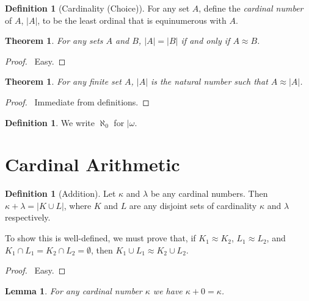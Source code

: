 \documentclass{report}
\let\qed\relax
\newtheorem{lemma}[axiom]{Lemma}
\newtheorem{theorem}[axiom]{Theorem}
\theoremstyle{definition}
\newtheorem{definition}[axiom]{Definition}
\begin{document}
    \begin{definition}[Cardinality (Choice)]
        For any set $A$, define the \emph{cardinal number} of $A$, $|A|$, to be the least ordinal that is
        equinumerous with $A$.
    \end{definition}

    \begin{theorem}
        For any sets $A$ and $B$, $|A| = |B|$ if and only if $A \approx B$.
    \end{theorem}

    \begin{proof}
        \pf\ Easy. \qed
    \end{proof}

    \begin{theorem}
        For any finite set $A$, $|A|$ is the natural number such that $A \approx |A|$.
    \end{theorem}

    \begin{proof}
        \pf\ Immediate from definitions. \qed
    \end{proof}

    \begin{definition}
        We write $\aleph_0$ for $|\omega$.
    \end{definition}

    \section{Cardinal Arithmetic}

    \begin{definition}[Addition]
        Let $\kappa$ and $\lambda$ be any cardinal numbers. Then $\kappa + \lambda = |K \cup L|$,
        where $K$ and $L$ are any disjoint sets of cardinality $\kappa$ and $\lambda$ respectively.

        To show this is well-defined, we must prove that, if $K_1 \approx K_2$, $L_1 \approx L_2$,
        and $K_1 \cap L_1 = K_2 \cap L_2 = \emptyset$, then $K_1 \cup L_1 \approx K_2 \cup L_2$.
    \end{definition}

    \begin{proof}
        \pf\ Easy.
    \end{proof}

    \begin{lemma}
        For any cardinal number $\kappa$ we have $\kappa + 0 = \kappa$.
    \end{lemma}
\end{document}
